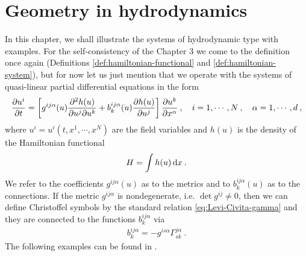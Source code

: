 \chapter{Geometry in hydrodynamics}

In this chapter, we shall illustrate the systems of hydrodynamic type with examples.
For the self-consistency of the Chapter 3 we come to the definition once again (Definitions \vref{def:hamiltonian-functional} and \vref{def:hamiltonian-system}), but for now let us just mention that we operate with the systems of quasi-linear partial differential equations in the form
\begin{align}
    \frac{\partial u^i}{\partial t} = \left[ g^{ij \alpha} (u) \frac{\partial^2 h(u)}{\partial u^j \partial u^k} + b_k^{ij \alpha} (u) \frac{\partial h(u)}{\partial u^j} \right] \frac{\partial u^k}{\partial x^\alpha} \:, \quad i = 1, \cdots , N \:, \quad \alpha = 1, \cdots , d \:,
\end{align}
where $u^i = u^i(t,x^1, \cdots, x^N)$ are the field variables and $h(u)$ is the density of the Hamiltonian functional
\begin{align}
    H = \int h(u) \, \mathrm{d} x \:.
\end{align}
We refer to the coefficients $g^{ij \alpha}(u)$ as to the metrics and to $b^{ij \alpha}_k(u)$ as to the connections. If the metric $g^{ij \alpha}$ is nondegenerate, i.e. $\det g^{ij} \neq 0$, then we can define Christoffel symbols by the standard relation \eqref{eq:Levi-Civita-gamma} and they are connected to the functions $b^{ij \alpha}_k$ via
\begin{align}
    b^{ij \alpha}_k = - g^{i s \alpha} \Gamma^{j \alpha}_{sk} \:.
\end{align}
The following examples can be found in \cite{Pavelka}.

